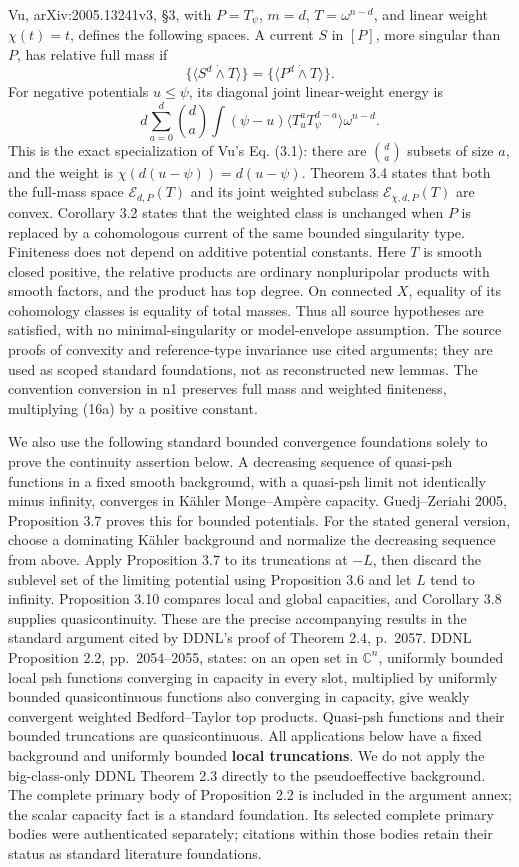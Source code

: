 \documentclass[
  11pt,
]{article}
\begin{document}
Vu, arXiv:2005.13241v3, §3, with \(P=T_\psi\), \(m=d\),
\(T=\omega^{n-d}\), and linear weight \(\chi(t)=t\), defines the
following spaces. A current \(S\) in \([P]\), more singular than \(P\),
has relative full mass if \[
\{\langle S^d\dot\wedge T\rangle\}=
\{\langle P^d\dot\wedge T\rangle\}.
\] For negative potentials \(u\leq\psi\), its diagonal joint
linear-weight energy is \[
d\sum_{a=0}^d\binom da\int(\psi-u)
\langle T_u^aT_\psi^{d-a}\rangle\omega^{n-d}.
\tag{16a}
\] This is the exact specialization of Vu's Eq. (3.1): there are
\(\binom da\) subsets of size \(a\), and the weight is
\(\chi(d(u-\psi))=d(u-\psi)\). Theorem 3.4 states that both the
full-mass space \(\mathcal{E}_{d,P}(T)\) and its joint weighted subclass
\(\mathcal{E}_{\chi,d,P}(T)\) are convex. Corollary 3.2 states that the
weighted class is unchanged when \(P\) is replaced by a cohomologous
current of the same bounded singularity type. Finiteness does not depend
on additive potential constants. Here \(T\) is smooth closed positive,
the relative products are ordinary nonpluripolar products with smooth
factors, and the product has top degree. On connected \(X\), equality of
its cohomology classes is equality of total masses. Thus all source
hypotheses are satisfied, with no minimal-singularity or model-envelope
assumption. The source proofs of convexity and reference-type invariance
use cited arguments; they are used as scoped standard foundations, not
as reconstructed new lemmas. The convention conversion in n1 preserves
full mass and weighted finiteness, multiplying (16a) by a positive
constant.

We also use the following standard bounded convergence foundations
solely to prove the continuity assertion below. A decreasing sequence of
quasi-psh functions in a fixed smooth background, with a quasi-psh limit
not identically minus infinity, converges in Kähler Monge--Ampère
capacity. Guedj--Zeriahi 2005, Proposition 3.7 proves this for
bounded potentials. For the stated general version, choose a dominating
K\"ahler background and normalize the decreasing sequence from above.
Apply Proposition 3.7 to its truncations at \(-L\), then discard the
sublevel set of the limiting potential using Proposition 3.6 and let
\(L\) tend to infinity. Proposition 3.10 compares local and global
capacities, and Corollary 3.8 supplies quasicontinuity. These are the
precise accompanying results in the standard argument cited by DDNL's
proof of Theorem 2.4, p.~2057. DDNL Proposition 2.2, pp.~2054--2055, states: on an open set in
\(\mathbb{C}^n\), uniformly bounded local psh functions converging in
capacity in every slot, multiplied by uniformly bounded quasicontinuous
functions also converging in capacity, give weakly convergent weighted
Bedford--Taylor top products. Quasi-psh functions and their bounded
truncations are quasicontinuous. All applications below have a fixed
background and uniformly bounded \textbf{local truncations}. We do not
apply the big-class-only DDNL Theorem 2.3 directly to the
pseudoeffective background. The complete primary body of Proposition 2.2
is included in the argument annex; the scalar capacity fact is a
standard foundation. Its selected complete primary bodies were
authenticated separately; citations within those bodies retain their
status as standard literature foundations.
\end{document}
